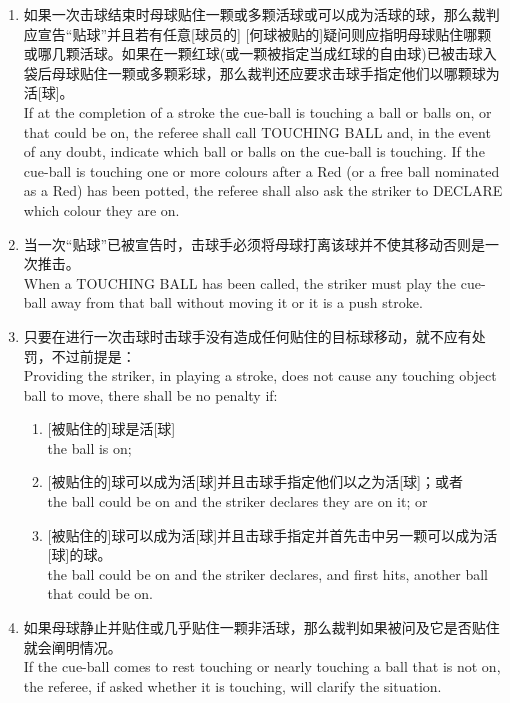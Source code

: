 \begin{enumerate}[label=(\alph*)]
    \item 如果一次击球结束时母球贴住一颗或多颗活球或可以成为活球的球，那么裁判应宣告``贴球''并且若有任意[球员的] [何球被贴的]疑问则应指明母球贴住哪颗或哪几颗活球。如果在一颗红球(或一颗被指定当成红球的自由球)已被击球入袋后母球贴住一颗或多颗彩球，那么裁判还应要求击球手指定他们以哪颗球为活[球]。\\
    If at the completion of a stroke the cue-ball is touching a ball or balls on, or that could be on, the referee shall call TOUCHING BALL and, in the event of any doubt, indicate which ball or balls on the cue-ball is touching. If the cue-ball is touching one or more colours after a Red (or a free ball nominated as a Red) has been potted, the referee shall also ask the striker to DECLARE which colour they are on.
    \item 当一次``贴球''已被宣告时，击球手必须将母球打离该球并不使其移动否则是一次推击。\\
    When a TOUCHING BALL has been called, the striker must play the cue-ball away from that ball without moving it or it is a push stroke.
    \item 只要在进行一次击球时击球手没有造成任何贴住的目标球移动，就不应有处罚，不过前提是：\\
    Providing the striker, in playing a stroke, does not cause any touching object ball to move, there shall be no penalty if:
    \begin{enumerate}[label=(\roman*)]
        \item ${}$[被贴住的]球是活[球]\\
        the ball is on;
        \item ${}$[被贴住的]球可以成为活[球]并且击球手指定他们以之为活[球]；或者\\
        the ball could be on and the striker declares they are on it; or
        \item ${}$[被贴住的]球可以成为活[球]并且击球手指定并首先击中另一颗可以成为活[球]的球。\\
        the ball could be on and the striker declares, and first hits, another ball that could be on.
    \end{enumerate}
    \item 如果母球静止并贴住或几乎贴住一颗非活球，那么裁判如果被问及它是否贴住就会阐明情况。\\
    If the cue-ball comes to rest touching or nearly touching a ball that is not on, the referee, if asked whether it is touching, will clarify the situation.

\end{enumerate}
